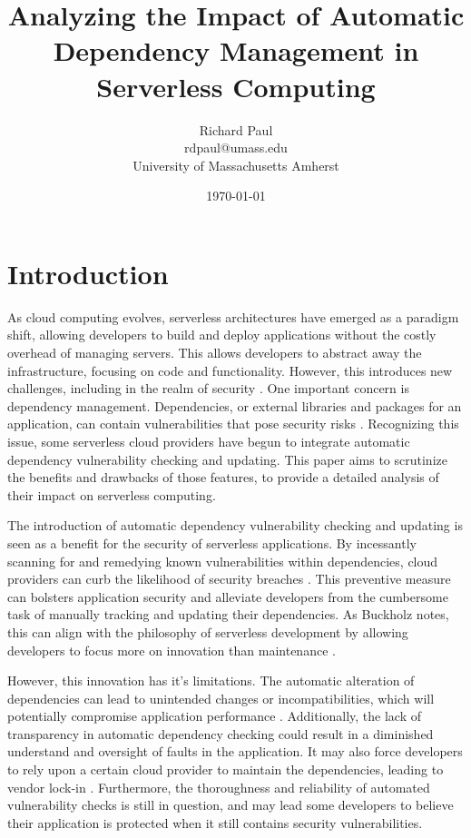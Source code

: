 \documentclass[12pt, letterpaper]{article}
\begin{document}
\title{Analyzing the Impact of Automatic Dependency Management in Serverless Computing}
\author{Richard Paul\\
	rdpaul@umass.edu\\
	University of Massachusetts Amherst}
\date{\today}
\maketitle

\section{Introduction}
As cloud computing evolves, serverless architectures have emerged as a paradigm shift, allowing developers to build and deploy applications without the costly overhead of managing servers. This allows developers to abstract away the infrastructure, focusing on code and functionality. However, this introduces new challenges, including in the realm of security \cite{baldini2017serverless}. One important concern is dependency management. Dependencies, or external libraries and packages for an application, can contain vulnerabilities that pose security risks \cite{marin2022serverless}. Recognizing this issue, some serverless cloud providers have begun to integrate automatic dependency vulnerability checking and updating. This paper aims to scrutinize the benefits and drawbacks of those features, to provide a detailed analysis of their impact on serverless computing.

The introduction of automatic dependency vulnerability checking and updating is seen as a benefit for the security of serverless applications. By incessantly scanning for and remedying known vulnerabilities within dependencies, cloud providers can curb the likelihood of security breaches \cite{snyk2023security}. This preventive measure can bolsters application security and alleviate developers from the cumbersome task of manually tracking and updating their dependencies. As Buckholz notes, this can align with the philosophy of serverless development by allowing developers to focus more on innovation than maintenance \cite{buckholz2018serverless}. 

However, this innovation has it's limitations. The automatic alteration of dependencies can lead to unintended changes or incompatibilities, which will potentially compromise application performance \cite{benischke2023updates}. Additionally, the lack of transparency in automatic dependency checking could result in a diminished understand and oversight of faults in the application. It may also force developers to rely upon a certain cloud provider to maintain the dependencies, leading to vendor lock-in \cite{kavis2014cloud}.
Furthermore, the thoroughness and reliability of automated vulnerability checks is still in question, and may lead some developers to believe their application is protected when it still contains security vulnerabilities.
\end{document}
